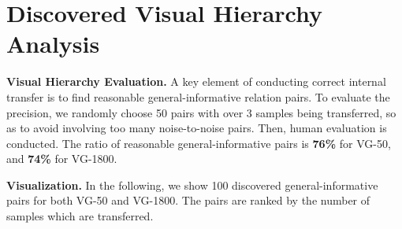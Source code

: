 \documentclass[runningheads]{llncs}
\begin{document}
\section{Discovered Visual Hierarchy Analysis}

\smallskip
\noindent
\textbf{Visual Hierarchy Evaluation.} A key element of conducting correct internal transfer is to find reasonable general-informative relation pairs.
To evaluate the precision, we randomly choose 50 pairs with over 3 samples being transferred, so as to avoid involving too many noise-to-noise pairs.
Then, human evaluation is conducted.
The ratio of reasonable general-informative pairs is \textbf{76\%} for VG-50, and \textbf{74\%} for VG-1800.



\smallskip
\noindent
\textbf{Visualization.} In the following, we show 100 discovered general-informative pairs for both VG-50 and VG-1800.
The pairs are ranked by the number of samples which are transferred.
\end{document}
